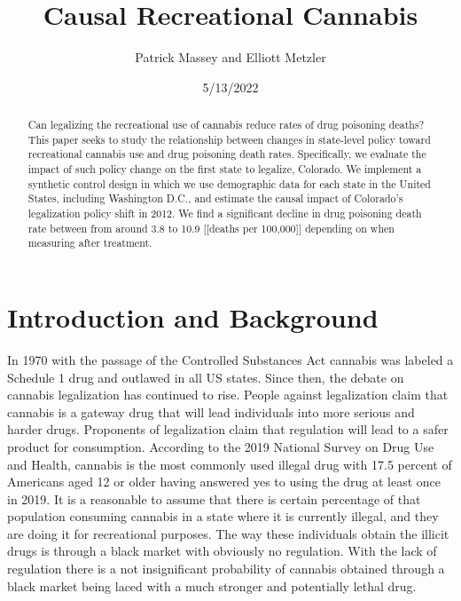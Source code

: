 \documentclass{article}
\author{Patrick Massey and Elliott Metzler}
\title{Causal Recreational Cannabis}
\date{5/13/2022}
\begin{document}
\maketitle

\begin{abstract}

Can legalizing the recreational use of cannabis reduce rates of drug poisoning deaths? This paper seeks to study the relationship between changes in state-level policy toward recreational cannabis use and drug poisoning death rates. Specifically, we evaluate the impact of such policy change on the first state to legalize, Colorado. We implement a synthetic control design in which we use demographic data for each state in the United States, including Washington D.C., and estimate the causal impact of Colorado's legalization policy shift in 2012. We find a significant decline in drug poisoning death rate between from around 3.8 to 10.9 [[deaths per 100,000]] depending on when measuring after treatment.

\end{abstract}

\newpage

\section{Introduction and Background}

In 1970 with the passage of the Controlled Substances Act cannabis was labeled a Schedule 1 drug and outlawed in all US states. Since then, the debate on cannabis legalization has continued to rise. People against legalization claim that cannabis is a gateway drug that will lead individuals into more serious and harder drugs. Proponents of legalization claim that regulation will lead to a safer product for consumption. According to the 2019 National Survey on Drug Use and Health, cannabis is the most commonly used illegal drug with 17.5 percent of Americans aged 12 or older having answered yes to using the drug at least once in 2019.  It is a reasonable to assume that there is certain percentage of that population consuming cannabis in a state where it is currently illegal, and they are doing it for recreational purposes. The way these individuals obtain the illicit drugs is through a black market with obviously no regulation. With the lack of regulation there is a not insignificant probability of cannabis obtained through a black market being laced with a much stronger and potentially lethal drug.
\end{document}
